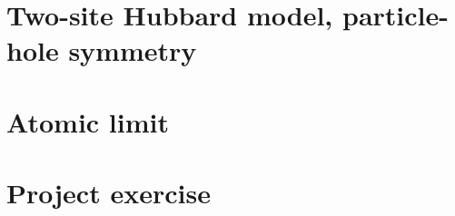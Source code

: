 








\section{Two-site Hubbard model, particle-hole symmetry}
%

\section{Atomic limit}


\section{Project exercise}
%


